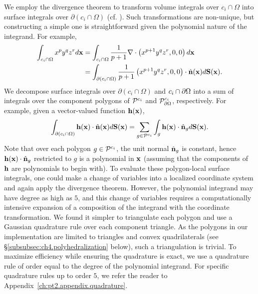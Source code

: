 We employ the divergence theorem to transform volume integrals over $c_i \cap \Omega$ into surface integrals over $\partial(c_i \cap \Omega)$ (cf. \cite{Min.Chohong07}). Such transformations are non-unique, but constructing a simple one is straightforward given the polynomial nature of the integrand. For example,
\begin{align*}
\int_{c_i \cap \Omega} x^p y^q z^r d\mathbf{x}
& = \int_{c_i \cap \Omega} \frac{1}{p+1} \nabla \cdot \left( x^{p+1} y^q z^r, 0, 0 \right) d\mathbf{x} \\
& = \int_{\partial(c_i \cap \Omega)} \frac{1}{p+1} \left( x^{p+1} y^q z^r, 0, 0 \right) \cdot \hat{\mathbf{n}}(\mathbf{x}) d\mathbf{S}(\mathbf{x}).
\end{align*}
We decompose surface integrals over $\partial(c_i \cap \Omega)$ and $c_i \cap \partial\Omega$ into a sum of integrals over the component polygons of $\mathcal{P}^{c_i}$ and $\mathcal{P}_{\partial\Omega}^{c_i}$, respectively. For example, given a vector-valued function $\mathbf{h}(\mathbf{x})$,
\begin{equation*}
\int_{\partial(c_i \cap \Omega)} \mathbf{h}(\mathbf{x}) \cdot \hat{\mathbf{n}}(\mathbf{x}) d\mathbf{S}(\mathbf{x}) = \sum_{g \in \mathcal{P}^{c_i}} \int_g \mathbf{h}(\mathbf{x}) \cdot \hat{\mathbf{n}}_g d\mathbf{S}(\mathbf{x}).
\end{equation*}
Note that over each polygon $g \in \mathcal{P}^{c_i}$, the unit normal $\hat{\mathbf{n}}_g$ is constant, hence $\mathbf{h}(\mathbf{x}) \cdot \hat{\mathbf{n}}_g$ restricted to $g$ is a polynomial in $\mathbf{x}$ (assuming that the components of $\mathbf{h}$ are polynomials to begin with). To evaluate these polygon-local surface integrals, one could make a change of variables into a localized coordinate system and again apply the divergence theorem. However, the polynomial integrand may have degree as high as $5$, and this change of variables requires a computationally intensive expansion of a composition of the integrand with the coordinate transformation. We found it simpler to triangulate each polygon and use a Gaussian quadrature rule over each component triangle. As the polygons in our implementation are limited to triangles and convex quadrilaterals (see \S\ref{subsubsec:ch4.polyhedralization} below), such a triangulation is trivial. To maximize efficiency while ensuring the quadrature is exact, we use a quadrature rule of order equal to the degree of the polynomial integrand. For specific quadrature rules up to order $5$, we refer the reader to Appendix~\ref{ch:pt2.appendix.quadrature}.

